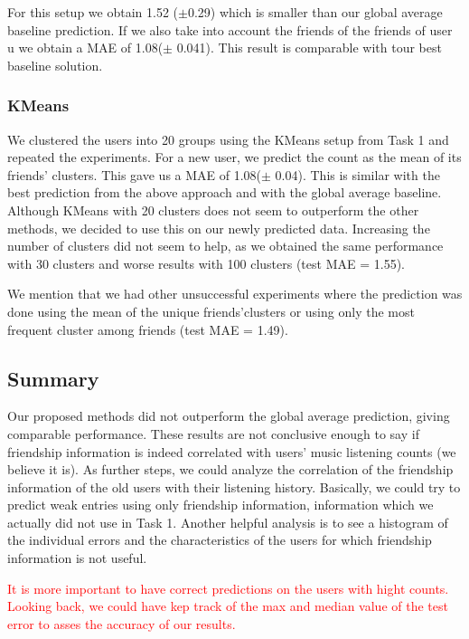 For this setup  we obtain  1.52 ($\pm$0.29) which is smaller than our global average baseline prediction.
If we also take into account the friends of the friends of user u we obtain  a MAE of 1.08($\pm$ 0.041). This result is comparable with tour best baseline solution.

\subsubsection{KMeans}
We clustered the users into 20 groups using the KMeans setup from Task 1
and repeated the experiments. For a new user,  we predict the count as the mean of its friends' clusters. This gave us a MAE of
1.08($\pm$ 0.04). This is similar with the best prediction from the above approach and with the  global average baseline. Although KMeans with 20 clusters does not seem to outperform the other methods, we decided to use this on our newly predicted data.
Increasing the number of clusters did not seem to help, as we obtained the same performance with 30 clusters and worse results with 100 clusters (test MAE = 1.55). 
 
We mention that we had other unsuccessful experiments where the prediction was done using the mean of the unique friends'clusters or using only the most frequent cluster among friends (test MAE = 1.49).

\subsection{Summary}
Our proposed methods did not outperform the global average prediction, giving comparable performance. These results are not conclusive enough to say if friendship information is indeed correlated with users' music listening counts (we believe it is). As further steps, we could analyze the correlation of the friendship information of the old users with their listening history. Basically, we could try to predict weak entries using only friendship information, information which we actually did not use in Task 1. Another helpful analysis is to see a histogram of the individual errors and the characteristics of the users for which friendship information is not useful.

\textcolor{red}{It is more important to have correct predictions on the users with hight counts. Looking back, we could have kep track of the max and median value of the test error to asses the accuracy of our results.}
